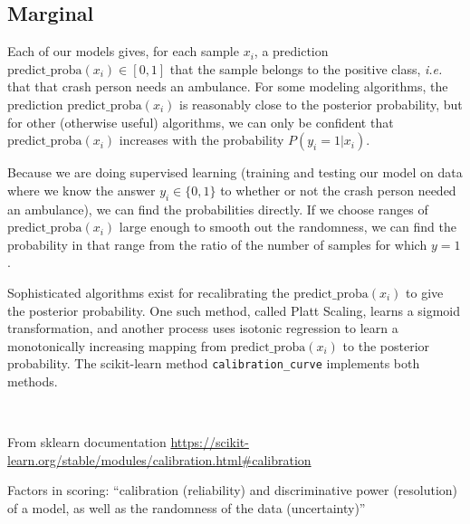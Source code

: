 \subsection{Marginal}\label{Marginal}

Each of our models gives, for each sample $x_i$, a prediction $\text{predict\_proba}(x_i) \in [0,1]$ that the sample belongs to the positive class, {\it i.e.} that that crash person needs an ambulance.  For some modeling algorithms, the prediction $\text{predict\_proba}(x_i)$ is reasonably close to the posterior probability, but for other (otherwise useful) algorithms, we can only be confident that $\text{predict\_proba}(x_i)$ increases with the probability $P(y_i=1 | x_i)$.
\cite{Niculescu-Mizil_2005}

 Because we are doing supervised learning (training and testing our model on data where we know the answer $y_i \in \{0,1\}$ to whether or not the crash person needed an ambulance), we can find the probabilities directly.  If we choose ranges of $\text{predict\_proba}(x_i)$ large enough to smooth out the randomness, we can find the probability in that range from the ratio of the number of samples for which $y=1$.  

Sophisticated algorithms exist for recalibrating the $\text{predict\_proba}(x_i)$ to give the posterior probability.  One such method, called Platt Scaling, learns a sigmoid transformation, and another process uses isotonic regression to learn a monotonically increasing mapping from $\text{predict\_proba}(x_i)$ to the posterior probability.  The scikit-learn method \verb|calibration_curve| implements both methods.  

\

From sklearn documentation \url{https://scikit-learn.org/stable/modules/calibration.html#calibration}

Factors in scoring:   ``calibration (reliability) and discriminative power (resolution) of a model, as well as the randomness of the data (uncertainty)''